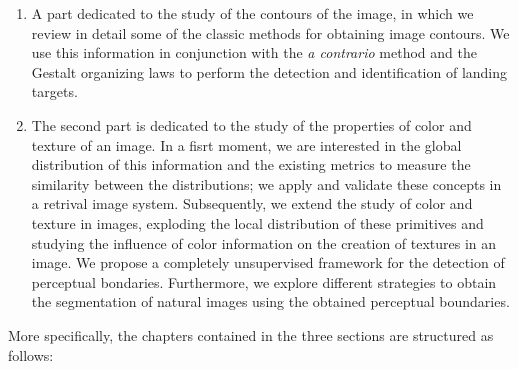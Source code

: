 \begin{enumerate}
	\item A part dedicated to the study of the contours of the image, in which we review in detail some of the classic methods for obtaining image contours. We use this information in conjunction with the \textit{a contrario} method and the Gestalt organizing laws to perform the detection and identification of landing targets.
	\item The second part is dedicated to the study of the properties of color and texture of an image. In a fisrt moment, we are interested in the global distribution of this information and the existing metrics to measure the similarity between the distributions; we apply and validate these concepts in a retrival image system. Subsequently, we extend the study of color and texture in images, exploding the local distribution of these primitives and studying the influence of color information on the creation of textures in an image. We propose a completely unsupervised framework for the detection of perceptual bondaries. Furthermore, we explore different strategies to obtain the segmentation of natural images using the obtained perceptual boundaries.
\end{enumerate}

More specifically, the chapters contained in the three sections are structured as follows:

